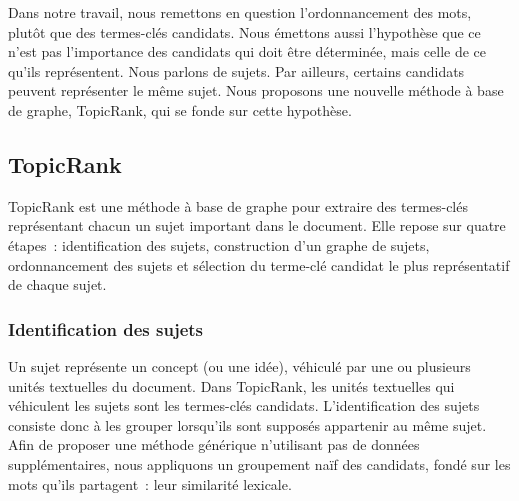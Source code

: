     Dans notre travail, nous remettons en question l'ordonnancement des mots,
    plutôt que des termes-clés candidats. Nous émettons
    aussi l'hypothèse que ce n'est pas l'importance des candidats qui doit être
    déterminée, mais celle de ce qu'ils représentent. Nous parlons de sujets.
    Par ailleurs, certains candidats peuvent représenter le même sujet. Nous
    proposons une nouvelle méthode à base de graphe, TopicRank, qui se fonde sur
    cette hypothèse.

    \subsection{TopicRank}
    \label{subsec:main:domain_independent_keyphrase_extraction-unsupervised_automatic_keyphrase_extraction-topicrank}
      TopicRank est une méthode à base de graphe pour extraire des termes-clés
      représentant chacun un sujet important dans le document.
      Elle repose sur quatre étapes~: identification des sujets, construction
      d'un graphe de sujets, ordonnancement des sujets et sélection du terme-clé
      candidat le plus représentatif de chaque sujet.

      \subsubsection{Identification des sujets}
      \label{subsubsec:main:domain_independent_keyphrase_extraction-unsupervised_automatic_keyphrase_extraction-topicrank-topic_identification}
        Un sujet représente un concept (ou une idée), véhiculé par une ou plusieurs
        unités textuelles du document. Dans TopicRank, les unités textuelles qui véhiculent
        les sujets sont les termes-clés candidats.
%
%
        L'identification des sujets consiste donc à les grouper lorsqu'ils sont
        supposés appartenir au même sujet.
        Afin de proposer une méthode générique n'utilisant pas de données
        supplémentaires, nous appliquons un groupement \og{}naïf\fg{} des
        candidats, fondé sur les mots qu'ils partagent~: leur similarité
        lexicale.

